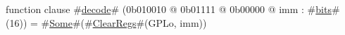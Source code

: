 function clause #\hyperref[zdecode]{decode}# (0b010010 @ 0b01111 @ 0b00000 @ imm : #\hyperref[zbits]{bits}#(16)) = #\hyperref[zSome]{Some}#(#\hyperref[zClearRegs]{ClearRegs}#(GPLo, imm))
